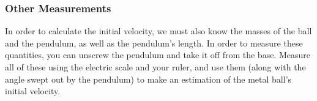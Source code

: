 


\subsubsection{Other Measurements}

In order to calculate the initial velocity, we must also know the masses of the ball and the pendulum, as well as the pendulum's length. In order to measure these quantities, you can unscrew the pendulum and take it off from the base. Measure all of these using the electric scale and your ruler, and use them (along with the angle swept out by the pendulum) to make an estimation of the metal ball's initial velocity.\myskip

